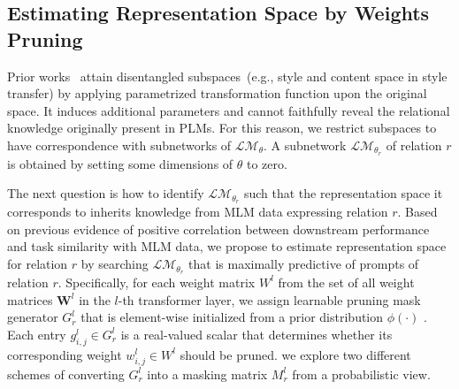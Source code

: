 \label{sec:prompts}
\subsection{Estimating Representation Space by Weights Pruning}
\label{sec:pruning}
Prior works~\citep{disen} attain disentangled subspaces~(e.g., style and content space in style transfer) by applying parametrized transformation function upon the original space. It induces additional parameters and cannot faithfully reveal the relational knowledge originally present in PLMs. For this reason, we restrict subspaces to have correspondence with subnetworks of $\mathcal{LM}_{\theta}$. A subnetwork $\mathcal{LM}_{\theta_r}$ of relation $r$  is obtained by setting some dimensions of $\theta$ to zero. 

The next question is how to identify $\mathcal{LM}_{\theta_r}$ such that the representation space it corresponds to inherits knowledge from MLM data expressing relation $r$. Based on previous evidence of positive correlation between downstream performance and task similarity with MLM data, we propose to estimate representation space for relation $r$ by searching $\mathcal{LM}_{\theta_r}$ 
that is maximally predictive of prompts of relation $r$. Specifically, for each weight matrix $W^l$ from the set of all weight matrices $\bm{W}^l$ in the $l$-th transformer layer, we assign 
learnable pruning mask generator $G_r^l$ 
that is element-wise initialized from a prior distribution $\phi(\cdot)$ .
Each entry $g_{i,j}^l\in G_r^l$ is a real-valued scalar that determines whether its corresponding weight $w_{i,j}^l\in W^l$ should be pruned. we explore two different schemes of converting $G_r^l$ into a masking matrix $M_r^l$ from a probabilistic view.

